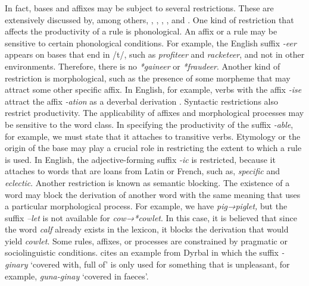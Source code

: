 \documentclass[output=paper]{langsci/langscibook}
\begin{document}
In fact, bases and affixes may be subject to several restrictions. These are extensively discussed by, among others, \citet{Bauer2001}, \citet{HaspelmathSims2010}, \citet{Lieber2009}, \citet{Rainer2005}, and \citet{Plag2006}. One kind of restriction that affects the productivity of a rule is phonological. An affix or a rule may be sensitive to certain phonological conditions. For example, the English suffix \textit{-eer} appears on bases that end in /t/, such as \textit{profiteer} and \textit{racketeer}, and not in other environments. Therefore, there is no \textit{*gaineer} or \textit{*fraudeer}. Another kind of restriction is morphological, such as the presence of some morpheme that may attract some other specific affix. In English, for example, verbs with the affix \textit{{}-ise} attract the affix \textit{{}-ation} as a deverbal derivation \citep{Fernandez-Dominguez2013}. Syntactic restrictions also restrict productivity. The applicability of affixes and morphological processes may be sensitive to the word class. In specifying the productivity of the suffix \textit{{}-able}, for example, we must state that it attaches to transitive verbs. Etymology or the origin of the base may play a crucial role in restricting the extent to which a rule is used. In English, the adjective-forming suffix \textit{{}-ic} is restricted, because it attaches to words that are loans from Latin or French, such as, \textit{specific} and \textit{eclectic}. Another restriction is known as semantic blocking. The existence of a word may block the derivation of another word with the same meaning that uses a particular morphological process. For example, we have \textit{pig→piglet,} but the suffix \textit{–let} is not available for \textit{cow→*cowlet}. In this case, it is believed that since the word \textit{calf} already exists in the lexicon, it blocks the derivation that would yield \textit{cowlet}. Some rules, affixes, or processes are constrained by pragmatic or sociolinguistic conditions. \citet[135]{Bauer2001} cites an example from Dyrbal in which the suffix \textit{{}-ginary} ‘covered with, full of’ is only used for something that is unpleasant, for example, \textit{guna-ginay} ‘covered in faeces’. 
\end{document}
